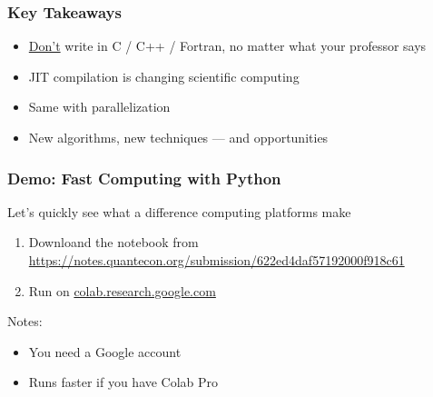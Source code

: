 \begin{frame}
    \frametitle{Key Takeaways}

    \begin{itemize}
        \item \underline{Don't} write in C / C++ / Fortran, no matter what your professor says
            \vspace{0.4em}
            \vspace{0.4em}
        \item JIT compilation is changing scientific computing
            \vspace{0.4em}
            \vspace{0.4em}
        \item Same with parallelization
            \vspace{0.4em}
            \vspace{0.4em}
        \item New algorithms, new techniques --- and opportunities
    \end{itemize}

\end{frame}


\begin{frame}
    \frametitle{Demo: Fast Computing with Python}

    Let's quickly see what a difference computing platforms make

            \vspace{0.4em}
    \begin{enumerate}
        \item Downloand the notebook from \url{https://notes.quantecon.org/submission/622ed4daf57192000f918c61}
            \vspace{0.4em}
        \item Run on \url{colab.research.google.com}
    \end{enumerate} 
            \vspace{0.4em}
            \vspace{0.4em}

    Notes:
    \begin{itemize}
        \item You need a Google account
            \vspace{0.4em}
        \item Runs faster if you have Colab Pro
    \end{itemize}

\end{frame}




